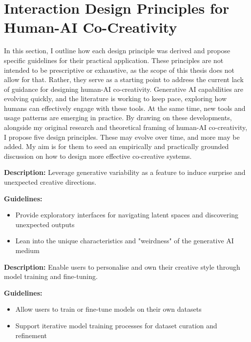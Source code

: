 \section{Interaction Design Principles for Human-AI Co-Creativity}

In this section, I outline how each design principle was derived and propose specific guidelines for their practical application. These principles are not intended to be prescriptive or exhaustive, as the scope of this thesis does not allow for that. Rather, they serve as a starting point to address the current lack of guidance for designing human-AI co-creativity. Generative AI capabilities are evolving quickly, and the literature is working to keep pace, exploring how humans can effectively engage with these tools. At the same time, new tools and usage patterns are emerging in practice. By drawing on these developments, alongside my original research and theoretical framing of human-AI co-creativity, I propose five design principles. These may evolve over time, and more may be added. My aim is for them to seed an empirically and practically grounded discussion on how to design more effective co-creative systems.

\begin{tcolorbox}[colback=orange!5,colframe=orange!75!black,title=\textbf{Principle 1: Serendipity}]
\textbf{Description:} Leverage generative variability as a feature to induce surprise and unexpected creative directions.

\textbf{Guidelines:}
\begin{itemize}
\item Provide exploratory interfaces for navigating latent spaces and discovering unexpected outputs
\item Lean into the unique characteristics and "weirdness" of the generative AI medium
\end{itemize}
\end{tcolorbox}


\begin{tcolorbox}[colback=purple!5,colframe=purple!75!black,title=\textbf{Principle 2: Personalisation}]
\textbf{Description:} Enable users to personalise and own their creative style through model training and fine-tuning.

\textbf{Guidelines:}
\begin{itemize}
\item Allow users to train or fine-tune models on their own datasets
\item Support iterative model training processes for dataset curation and refinement
\end{itemize}
\end{tcolorbox}


